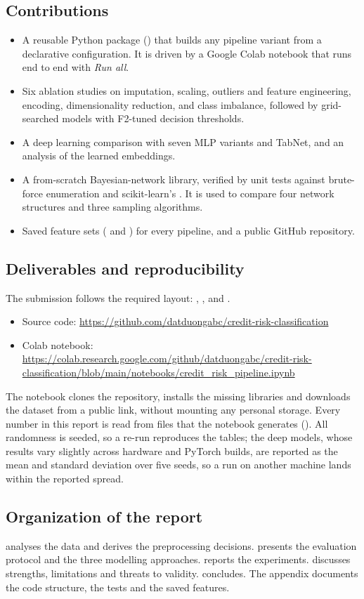 \subsection{Contributions}
\begin{itemize}
  \item A reusable Python package () that builds any pipeline variant from a declarative configuration. It is driven by a Google Colab notebook that runs end to end with \emph{Run all}.
  \item Six ablation studies on imputation, scaling, outliers and feature engineering, encoding, dimensionality reduction, and class imbalance, followed by grid-searched models with F2-tuned decision thresholds.
  \item A deep learning comparison with seven MLP variants and TabNet, and an analysis of the learned embeddings.
  \item A from-scratch Bayesian-network library, verified by unit tests against brute-force enumeration and scikit-learn's . It is used to compare four network structures and three sampling algorithms.
  \item Saved feature sets ( and ) for every pipeline, and a public GitHub repository.
\end{itemize}

\subsection{Deliverables and reproducibility}
The submission follows the required layout: , ,  and .
\begin{itemize}[nosep]
  \item Source code: \url{https://github.com/datduongabc/credit-risk-classification}
  \item Colab notebook: \url{https://colab.research.google.com/github/datduongabc/credit-risk-classification/blob/main/notebooks/credit_risk_pipeline.ipynb}
\end{itemize}
The notebook clones the repository, installs the missing libraries and downloads the dataset from a public link, without mounting any personal storage.
Every number in this report is read from files that the notebook generates ().
All randomness is seeded, so a re-run reproduces the tables; the deep models, whose results vary slightly across hardware and PyTorch builds, are reported as the mean and standard deviation over five seeds, so a run on another machine lands within the reported spread.

\subsection{Organization of the report}
 analyses the data and derives the preprocessing decisions.
 presents the evaluation protocol and the three modelling approaches.
 reports the experiments.
 discusses strengths, limitations and threats to validity.
 concludes.
The appendix documents the code structure, the tests and the saved features.

